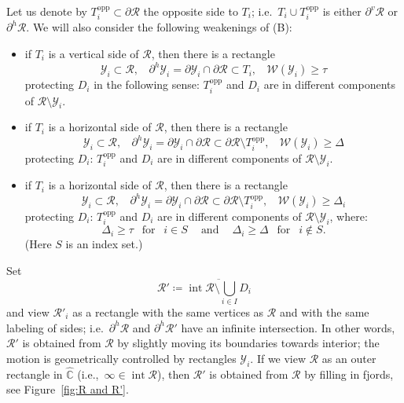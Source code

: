 \documentclass{amsart}
\renewcommand{\sp}{{\ \ }}
\newcommand{\1}{{\mathbb 1 }}
\newcommand{\Width}{{\mathcal W}}
\newcommand{\opp}{{\text{opp}}}
\newcommand\YY{\mathcal{Y}}
\newcommand\RR{\mathcal{R}}
\newcommand\intr{\operatorname{int}}
\newcommand{\wC}{\widehat{\mathbb{C}}}
\theoremstyle{remark}
\numberwithin{equation}{section}
\theoremstyle{definition}
\begin{document}
Let us denote by $T^\opp_i\subset \partial \RR$ the opposite side to $T_i$; i.e.~$T_i\cup T^\opp_i$ is either $\partial ^v\RR$ or $\partial ^h\RR$. We will also consider the following weakenings of (B):
\begin{itemize}
\item[(B${}_{v}$)] if $T_i$ is a vertical side of $\RR$, then there is a rectangle 
\[\YY_i\subset \RR,\sp\sp \partial^h \YY_i =\partial \YY_i\cap \partial \RR \subset T_i,\sp\sp \Width(\YY_i)\ge \tau \] 
protecting $D_i$ in the following sense: $ T^\opp_i$ and $D_i$ are in different components of $\RR\setminus \YY_i$.
\item[(B${}_{h}$)] if $T_i$ is a horizontal side of $\RR$, then there is a rectangle 
\[\YY_i\subset \RR,\sp\sp \partial^h \YY_i =\partial \YY_i\cap \partial \RR \subset \partial \RR \setminus T^\opp_i,\sp\sp \Width(\YY_i)\ge \Delta \] 
protecting $D_i$: $ T^\opp_i$ and $D_i$ are in different components of $\RR\setminus \YY_i$.
\item[(B$'{}_{h}$)] if $T_i$ is a horizontal side of $\RR$, then there is a rectangle 
\[\YY_i\subset \RR,\sp\sp \partial^h \YY_i =\partial \YY_i\cap \partial \RR \subset \partial \RR \setminus T^\opp_i,\sp\sp \Width(\YY_i)\ge \Delta_i \] 
protecting $D_i$: $ T^\opp_i$ and $D_i$ are in different components of $\RR\setminus \YY_i$, where:
\[\Delta_i\ge \tau \sp \text{ for } \sp i \in S\sp\sp\text{ and }\sp\sp \Delta_i\ge \Delta \sp \text{ for }\sp i \not\in S.\]
(Here $S$ is an index set.)
\end{itemize}


 Set \[ \RR'\coloneqq \overline{ \intr \RR\setminus  \bigcup_{i\in I} D_i }\]
and view $\RR'_i$ as a rectangle with the same vertices as $\RR$ and with the same labeling of sides; i.e.~$\partial^h \RR$ and $\partial ^h \RR'$ have an infinite intersection. In other words, $\RR'$ is obtained from $\RR$ by slightly moving its boundaries towards interior; the motion is geometrically controlled by rectangles $\YY_i$. If we view $\RR$ as an outer rectangle in $\wC$ (i.e.,~$\infty\in \intr \RR$), then $\RR'$ is obtained from $\RR$ by filling in fjords, see Figure~\ref{fig:R and R'}. 
\end{document}
